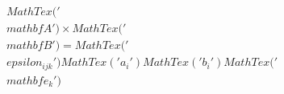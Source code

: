 \documentclass[preview]{standalone}
\begin{document}
\begin{align*}
MathTex('\\mathbf{A}') \times MathTex('\\mathbf{B}') = MathTex('\\epsilon_{ijk}') MathTex('a_i') MathTex('b_i') MathTex('\\mathbf{e}_k')
\end{align*}
\end{document}
